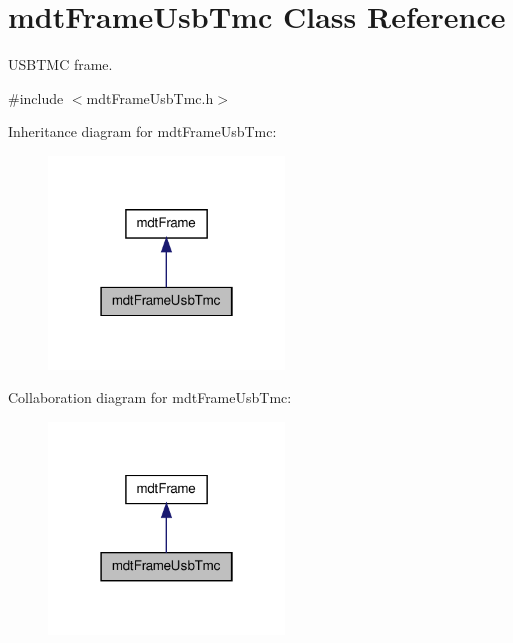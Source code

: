 \hypertarget{classmdt_frame_usb_tmc}{
\section{mdtFrameUsbTmc Class Reference}
\label{classmdt_frame_usb_tmc}
}


USBTMC frame.  




{\ttfamily \#include $<$mdtFrameUsbTmc.h$>$}



Inheritance diagram for mdtFrameUsbTmc:\nopagebreak
\begin{figure}[H]
\begin{center}
\leavevmode
\includegraphics[width=178pt]{classmdt_frame_usb_tmc__inherit__graph}
\end{center}
\end{figure}


Collaboration diagram for mdtFrameUsbTmc:\nopagebreak
\begin{figure}[H]
\begin{center}
\leavevmode
\includegraphics[width=178pt]{classmdt_frame_usb_tmc__coll__graph}
\end{center}
\end{figure}
